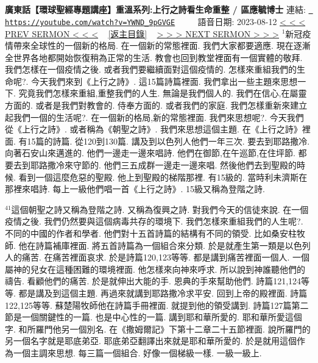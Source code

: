 \documentclass{book}
\begin{document}
\section{}
\label{sec:YWND_9pGVGE}
\textbf{廣東話【環球聖經專題講座】重溫系列:上行之詩看生命重整 / 區應毓博士}
\newline
\newline
連結: \href{https://youtube.com/watch?v=YWND_9pGVGE}{\texttt{ https://youtube.com/watch?v=YWND\_9pGVGE}} ~~~~ 語音日期: 2023-08-12 
\newline
\newline
\hyperref[sec:m3mUgMGT_bg]{\small{< < < PREV SERMON < < <}}
~
\hyperref[sec:index]{\small{[返主目錄]}}
~
\hyperref[sec:8a3cVfOxFFc]{\small{> > > NEXT SERMON > > >}}
\newline
\newline
$^{1}$新冠疫情帶來全球性的一個新的格局.
在一個新的常態裡面.
我們大家都要適應.
現在逐漸全世界各地都開始恢復稍為正常的生活.
教會也回到教堂裡面有一個實體的敬拜.
我們怎樣在一個疫情之後.
或者我們要繼續面對這個疫情的.
怎樣來重組我們的生命呢?.
今天我們來到《上行之詩》.
這15篇詩篇裡面.
我們拿出一些主題來思想一下.
究竟我們怎樣來重組,重整我們的人生.
無論是我們個人的.
我們在信心,在屬靈方面的.
或者是我們對教會的.
侍奉方面的.
或者我們的家庭.
我們怎樣重新來建立起我們一個的生活呢?.
在一個新的格局,新的常態裡面.
我們來思想呢?.
今天我們從《上行之詩》.
或者稱為《朝聖之詩》.
我們來思想這個主題.
在《上行之詩》裡面.
有15篇的詩篇.
從120到130篇.
講及到以色列人他們一年三次.
要去到耶路撒冷.
向著石安山來邁進的.
他們一邊走一邊來唱詩.
他們在御節,在午巡節,在住坪節.
都要去到耶路撒冷來守節的.
他們三五成群一邊走一邊來唱.
然後他們去到聖殿的時候.
看到一個這麼危惡的聖殿.
他上到聖殿的梯階那裡.
有15級的.
當時利未濟斯在那裡來唱詩.
每上一級他們唱一首《上行之詩》.
15級又稱為登階之詩.

$^{41}$這個朝聖之詩又稱為登階之詩.
又稱為復興之詩.
對我們今天的信徒來說.
在一個疫情之後.
我們仍然要與這個病毒共存的環境下.
我們怎樣來重組我們的人生呢?.
不同的中國的作者和學者.
他們對十五首詩篇的結構有不同的領受.
比如桑安柱牧師.
他在詩篇補庫裡面.
將五首詩篇為一個組合來分類.
於是就產生第一類是以色列人的痛苦.
在痛苦裡面哀求.
於是詩篇120,123等等.
都是講到痛苦裡面一個人.
一個屬神的兒女在這種困難的環境裡面.
他怎樣來向神來呼求.
所以說到神誰聽他們的禱告.
看顧他們的痛苦.
於是就伸出大能的手.
恩典的手來幫助他們.
詩篇121,124等等.
都是講及到這個主題.
再過來就講到耶路撒冷求平安.
回到上帝的殿裡面.
詩篇122,125等等.
蘇楚陽牧師他在詩篇手冊裡面.
就提到他的領受講到.
詩篇127篇第二節是一個關鍵性的一篇.
也是中心性的一篇.
講到耶和華所愛的.
耶和華所愛這個字.
和所羅門他另一個別名.
在《撒姆爾記》下第十二章二十五節裡面.
說所羅門的另一個名字就是耶底弟亞.
耶底弟亞翻譯出來就是耶和華所愛的.
於是就用這個作為一個主調來思想.
每三篇一個組合.
好像一個梯級一樣.
一級一級上.
\end{document}
